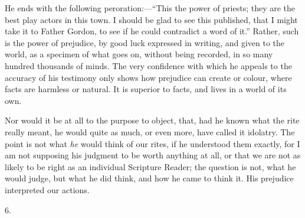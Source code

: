 He ends with the following peroration:—``This
the power of priests; they are the best play actors in
this town. I should be glad to see this published, that I
might take it to Father Gordon, to see if he could
contradict a word of it.'' Rather, such is the power
of prejudice, by good luck expressed in writing, and
given to the world, as a specimen of what goes on,
without being recorded, in so many hundred thousands of
minds. The very confidence with which he appeals to the
accuracy of his testimony only shows how prejudice can
create or colour, where facts are harmless or natural. It
is superior to facts, and lives in a world of its own.

Nor would it be at all to the purpose to object, that,
had he known what the rite really meant, he would quite
as much, or even more, have called it idolatry. The point
is not what \emph{he} would think of our rites, if he
understood them exactly, for I am not supposing his
judgment to be worth anything at all, or that we are not
as likely to be right as an individual Scripture Reader;
the question is not, what he would judge, but what he did
think, and how he came to think it. His prejudice
interpreted our actions.

6.


